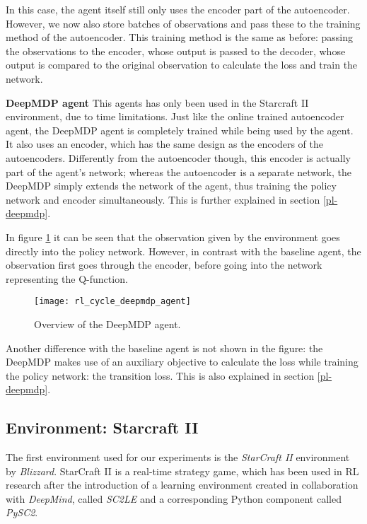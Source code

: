 In this case, the agent itself still only uses the encoder part of the autoencoder. However, we now also store batches of observations and pass these to the training method of the autoencoder. This training method is the same as before: passing the observations to the encoder, whose output is passed to the decoder, whose output is compared to the original observation to calculate the loss and train the network.\newline

\noindent \textbf{DeepMDP agent}\newline
\noindent This agents has only been used in the Starcraft II environment, due to time limitations. Just like the online trained autoencoder agent, the DeepMDP agent is completely trained while being used by the agent. It also uses an encoder, which has the same design as the encoders of the autoencoders. Differently from the autoencoder though, this encoder is actually part of the agent's network; whereas the autoencoder is a separate network, the DeepMDP simply extends the network of the agent, thus training the policy network and encoder simultaneously. This is further explained in section \ref{pl-deepmdp}.

In figure \ref{fig:rl_cycle_deepmdp} it can be seen that the observation given by the environment goes directly into the policy network. However, in contrast with the baseline agent, the observation first goes through the encoder, before going into the network representing the Q-function.

\begin{figure}[h]
    \centering
    \texttt{[image: rl\_cycle\_deepmdp\_agent]}
    \caption{Overview of the DeepMDP agent.}
    \label{fig:rl_cycle_deepmdp}
\end{figure}

Another difference with the baseline agent is not shown in the figure: the DeepMDP makes use of an auxiliary objective to calculate the loss while training the policy network: the transition loss. This is also explained in section \ref{pl-deepmdp}.

\subsection{Environment: Starcraft II}\label{research-env-pysc2}
The first environment used for our experiments is the \emph{StarCraft II} environment by \emph{Blizzard}\cite{blizzard}. StarCraft II is a real-time strategy game, which has been used in RL research after the introduction of a learning environment created in collaboration with \emph{DeepMind}, called \emph{SC2LE} and a corresponding Python component called \emph{PySC2}\cite{pysc2}.

